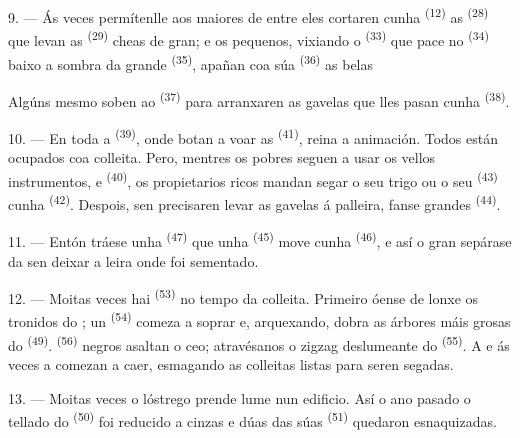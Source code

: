 9. --- Ás veces permítenlle aos maiores de entre eles cortaren cunha 
\textsuperscript{(12)} as  \textsuperscript{(28)} que levan as
 \textsuperscript{(29)} cheas de gran; e os pequenos, vixiando o
 \textsuperscript{(33)} que pace no 
\textsuperscript{(34)} baixo a sombra da grande  \textsuperscript{(35)},
apañan coa súa  \textsuperscript{(36)} as belas

Algúns mesmo soben ao  \textsuperscript{(37)} para arranxaren as gavelas que
lles pasan cunha  \textsuperscript{(38)}.

10. --- En toda a  \textsuperscript{(39)}, onde botan a voar as
 \textsuperscript{(41)}, reina a animación. Todos están ocupados coa
colleita. Pero, mentres os pobres seguen a usar os vellos instrumentos,
 e  \textsuperscript{(40)}, os propietarios
ricos mandan segar o seu trigo ou o seu  \textsuperscript{(43)} cunha
 \textsuperscript{(42)}. Despois, sen precisaren levar as gavelas á
palleira, fanse grandes  \textsuperscript{(44)}.

11. --- Entón tráese unha  \textsuperscript{(47)} que unha
 \textsuperscript{(45)} move cunha 
\textsuperscript{(46)}, e así o gran sepárase da  sen deixar a leira onde foi
sementado.

\VUsaut{5.0mm}
\VUsaut{3.4mm}

12. --- Moitas veces hai  \textsuperscript{(53)} no tempo da colleita.
Primeiro óense de lonxe os tronidos do ; un 
\textsuperscript{(54)} comeza a soprar e, arquexando, dobra as árbores máis grosas do
 \textsuperscript{(49)}.  \textsuperscript{(56)} negros
asaltan o ceo; atravésanos o zigzag deslumeante do
 \textsuperscript{(55)}. A  e ás veces a
 comezan a caer, esmagando as colleitas listas para seren segadas.

13. --- Moitas veces o lóstrego prende lume nun edificio. Así o ano pasado o tellado do
 \textsuperscript{(50)} foi reducido a cinzas e dúas das súas
 \textsuperscript{(51)} quedaron esnaquizadas.

